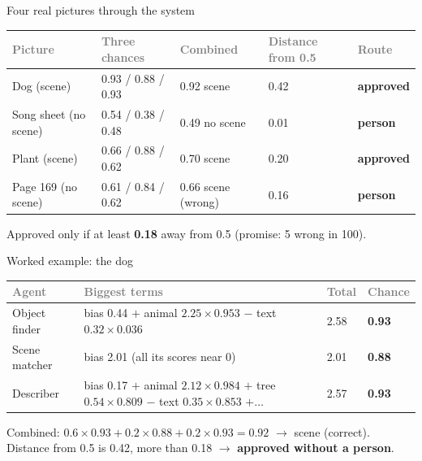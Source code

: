 \documentclass[aspectratio=169,11pt]{beamer}
\newcommand{\yes}[1]{\textcolor{accent}{\textbf{#1}}}
\newcommand{\no}[1]{\textcolor{warn}{\textbf{#1}}}
\newcommand{\h}[1]{\textcolor{grey}{#1}}
\newcommand{\remark}[1]{\par\vspace{0.35cm}{\small\textcolor{grey}{#1}}}
\begin{document}
\begin{frame}{Four real pictures through the system}
\small
\begin{tabular}{@{}L{2.6cm} L{3cm} L{2.6cm} L{1.6cm} L{1.8cm}@{}}
\toprule
\h{Picture} & \h{Three chances} & \h{Combined} & \h{Distance from 0.5} & \h{Route}\\
\midrule
Dog (scene) & 0.93 / 0.88 / 0.93 & 0.92 scene & 0.42 & \yes{approved}\\
Song sheet (no scene) & 0.54 / 0.38 / 0.48 & 0.49 no scene & 0.01 & \no{person}\\
Plant (scene) & 0.66 / 0.88 / 0.62 & 0.70 scene & 0.20 & \yes{approved}\\
Page 169 (no scene) & 0.61 / 0.84 / 0.62 & 0.66 scene (wrong) & 0.16 & \no{person}\\
\bottomrule
\end{tabular}

\vspace{0.4cm}
\normalsize
Approved only if at least \textbf{0.18} away from 0.5 (promise: 5 wrong in 100).
\remark{Page 169 is answered wrongly, and the system is not sure, so a person catches it. That is the system working as intended.}
\end{frame}

\begin{frame}{Worked example: the dog}
\small
\begin{tabular}{@{}L{2.8cm} L{6.6cm} C{1.4cm} C{1.4cm}@{}}
\toprule
\h{Agent} & \h{Biggest terms} & \h{Total} & \h{Chance}\\
\midrule
Object finder & bias 0.44 $+$ animal $2.25 \times 0.953$ $-$ text $0.32 \times 0.036$ & 2.58 & \textbf{0.93}\\
Scene matcher & bias 2.01 (all its scores near 0) & 2.01 & \textbf{0.88}\\
Describer & bias 0.17 $+$ animal $2.12 \times 0.984$ $+$ tree $0.54 \times 0.809$ $-$ text $0.35 \times 0.853$ $+ \dots$ & 2.57 & \textbf{0.93}\\
\bottomrule
\end{tabular}
\vspace{0.4cm}
\normalsize

Combined: $0.6 \times 0.93 + 0.2 \times 0.88 + 0.2 \times 0.93 = \mathbf{0.92}$ $\to$ scene (correct).\\
Distance from 0.5 is 0.42, more than 0.18 $\to$ \yes{approved without a person}.
\end{frame}
\end{document}
